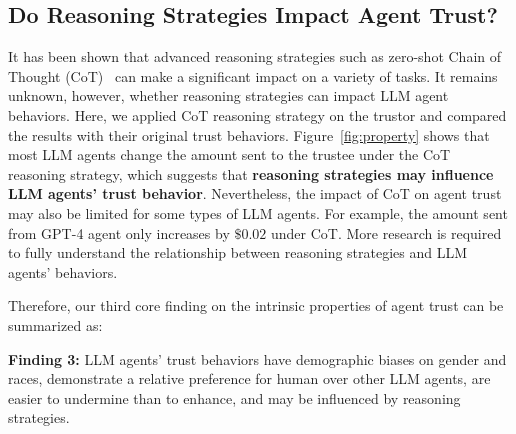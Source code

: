 \subsection{Do Reasoning Strategies Impact Agent Trust?}
\vspace{-1mm}

It has been shown that advanced reasoning strategies such as zero-shot Chain of Thought (CoT)~\citep{cot} can make a significant impact on a variety of tasks. It remains unknown, however, whether reasoning strategies can impact LLM agent behaviors. Here, we applied CoT reasoning strategy on the trustor and compared the results  with their original trust behaviors. Figure~\ref{fig:property} shows that most LLM agents change the amount sent to the trustee under the  CoT reasoning strategy, which suggests that \textbf{reasoning strategies may influence LLM agents' trust behavior}.  Nevertheless, the impact of CoT on agent trust may also be limited for some types of LLM agents. For example, the amount sent from GPT-4 agent only increases by $\$0.02$ under CoT. More research is required to fully understand the relationship between reasoning strategies and LLM agents' behaviors.




































Therefore, our third core finding on the intrinsic properties of agent trust can be summarized as:
\vspace{-1mm}
\begin{center}
\begin{tcolorbox}[width=0.9\linewidth, boxrule=3pt, colback=gray!20, colframe=gray!20]
\textbf{Finding 3:} 
LLM agents' trust behaviors have demographic biases on gender and races,  demonstrate a relative preference for human over other LLM agents, are easier to undermine than to enhance, and may be influenced by  reasoning strategies.
\end{tcolorbox}
\end{center}
\vspace{-2mm}









